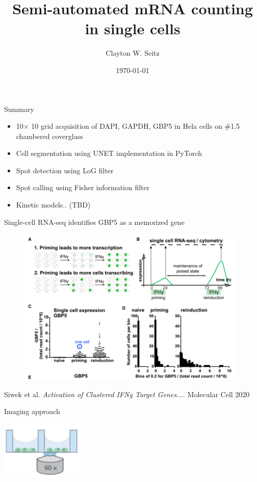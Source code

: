 \documentclass[aspectratio=1610]{beamer}					%
\title{Semi-automated mRNA counting in single cells}	%
\author{Clayton W. Seitz}								%
\date{\today}									%
\begin{document}
\begin{frame}
  \titlepage
\end{frame}


%

\begin{frame}{Summary}
\begin{itemize}
\item 10$\times$ 10 grid acquisition of DAPI, GAPDH, GBP5 in Hela cells on \#1.5 chambered coverglass
\item Cell segmentation using UNET implementation in PyTorch
\item Spot detection using LoG filter
\item Spot calling using Fisher information filter
\item Kinetic models.. (TBD)
\end{itemize}
\end{frame}

\begingroup
{}
\begin{frame}{Single-cell RNA-seq identifies GBP5 as a memorized gene}
\begin{figure}
\includegraphics[width=11cm]{figure-3.png}
\end{figure}
Siwek et al. \textit{Activation of Clustered IFNg Target Genes...}. Molecular Cell 2020
\end{frame}
\endgroup



\begin{frame}{Imaging approach}
\begin{center}
\includegraphics[width=0.3\textwidth]{Wells.png}
\end{center}
\end{frame}
\end{document}
